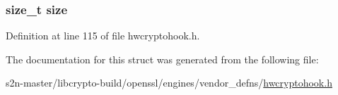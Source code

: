 \subsubsection[{\texorpdfstring{size}{size}}]{\setlength{\rightskip}{0pt plus 5cm}size\+\_\+t size}\hypertarget{struct_h_w_crypto_hook___err_msg_buf_a854352f53b148adc24983a58a1866d66}{}\label{struct_h_w_crypto_hook___err_msg_buf_a854352f53b148adc24983a58a1866d66}


Definition at line 115 of file hwcryptohook.\+h.



The documentation for this struct was generated from the following file\+:\begin{DoxyCompactItemize}
\item 
s2n-\/master/libcrypto-\/build/openssl/engines/vendor\+\_\+defns/\hyperlink{hwcryptohook_8h}{hwcryptohook.\+h}\end{DoxyCompactItemize}
